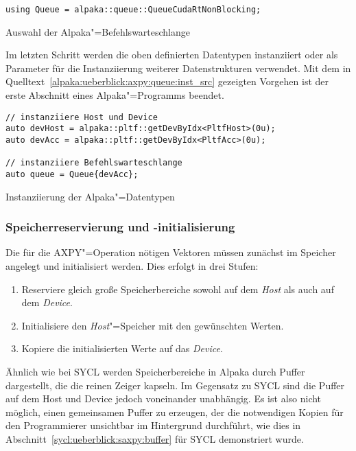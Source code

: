 \begin{code}
    \begin{verbatim}
using Queue = alpaka::queue::QueueCudaRtNonBlocking;
    \end{verbatim}
    \caption{Auswahl der Alpaka"=Befehlswarteschlange}
    \label{alpaka:ueberblick:axpy:queue:queue_src}
\end{code}

Im letzten Schritt werden die oben definierten Datentypen instanziiert oder als
Parameter für die Instanziierung weiterer Datenstrukturen verwendet. Mit dem
in Quelltext~\ref{alpaka:ueberblick:axpy:queue:inst_src} gezeigten Vorgehen ist
der erste Abschnitt eines Alpaka"=Programms beendet.

\begin{code}
    \begin{verbatim}
// instanziiere Host und Device
auto devHost = alpaka::pltf::getDevByIdx<PltfHost>(0u);
auto devAcc = alpaka::pltf::getDevByIdx<PltfAcc>(0u);

// instanziiere Befehlswarteschlange
auto queue = Queue{devAcc};
    \end{verbatim}
    \caption{Instanziierung der Alpaka"=Datentypen}
    \label{alpaka:ueberblick:axpy:queue:inst_src}
\end{code}

\subsubsection{Speicherreservierung und -initialisierung}
\label{alpaka:ueberblick:axpy:buffer}

Die für die AXPY"=Operation nötigen Vektoren müssen zunächst im Speicher
angelegt und initialisiert werden. Dies erfolgt in drei Stufen:

\begin{enumerate}
    \item Reserviere gleich große Speicherbereiche sowohl auf dem \textit{Host}
          als auch auf dem \textit{Device}.
    \item Initialisiere den \textit{Host}"=Speicher mit den gewünschten Werten.
    \item Kopiere die initialisierten Werte auf das \textit{Device}.
\end{enumerate}

Ähnlich wie bei SYCL werden Speicherbereiche in Alpaka durch Puffer dargestellt,
die die reinen Zeiger kapseln. Im Gegensatz zu SYCL sind die Puffer auf dem Host
und Device jedoch voneinander unabhängig. Es ist also nicht möglich, einen
gemeinsamen Puffer zu erzeugen, der die notwendigen Kopien für den Programmierer
unsichtbar im Hintergrund durchführt, wie dies in
Abschnitt~\ref{sycl:ueberblick:saxpy:buffer} für SYCL demonstriert wurde.

